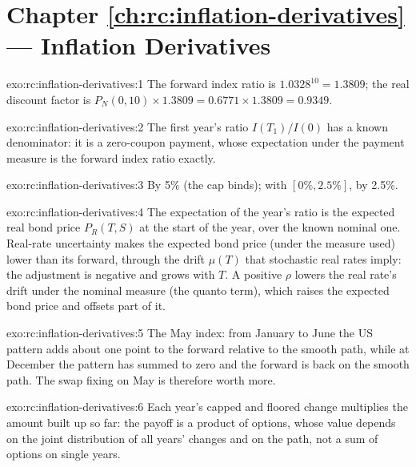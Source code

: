 \section*{Chapter \ref{ch:rc:inflation-derivatives} --- Inflation Derivatives}

\begin{solution}{exo:rc:inflation-derivatives:1}
The forward index ratio is $1.0328^{10} = 1.3809$; the real discount factor is
$P_N(0,10)\times1.3809 = 0.6771\times1.3809 = 0.9349$.
\end{solution}

\begin{solution}{exo:rc:inflation-derivatives:2}
The first year's ratio $I(T_1)/I(0)$ has a known denominator: it is a zero-coupon payment,
whose expectation under the payment measure is the forward index ratio exactly.
\end{solution}

\begin{solution}{exo:rc:inflation-derivatives:3}
By 5\% (the cap binds); with $[0\%,2.5\%]$, by 2.5\%.
\end{solution}

\begin{solution}{exo:rc:inflation-derivatives:4}
The expectation of the year's ratio is the expected real bond price $P_R(T,S)$ at the
start of the year, over the known nominal one. Real-rate uncertainty makes the expected
bond price (under the measure used) lower than its forward, through the drift $\mu(T)$ that
stochastic real rates imply: the adjustment is negative and grows with $T$. A positive
$\rho$ lowers the real rate's drift under the nominal measure (the quanto term), which
raises the expected bond price and offsets part of it.
\end{solution}

\begin{solution}{exo:rc:inflation-derivatives:5}
The May index: from January to June the US pattern adds about one point to the forward
relative to the smooth path, while at December the pattern has summed to zero and the
forward is back on the smooth path. The swap fixing on May is therefore worth more.
\end{solution}

\begin{solution}{exo:rc:inflation-derivatives:6}
Each year's capped and floored change multiplies the amount built up so far: the payoff is
a product of options, whose value depends on the joint distribution of all years' changes
and on the path, not a sum of options on single years.
\end{solution}

